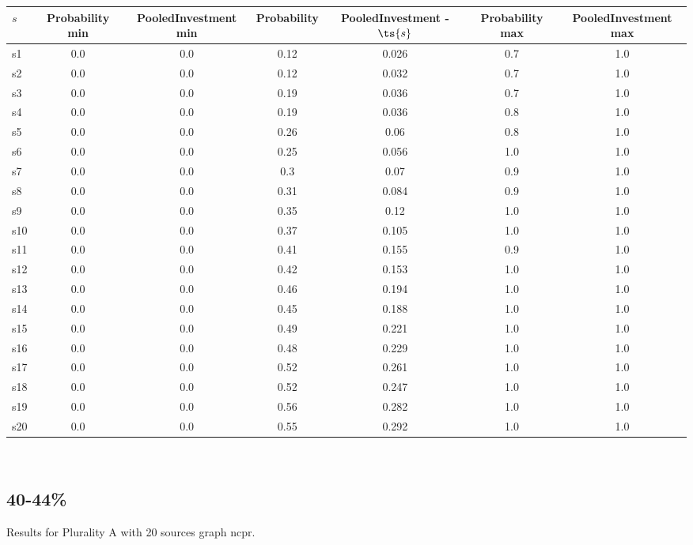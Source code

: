 \documentclass{article}
\begin{document}
\noindent\begin{tabular}{|l|c|c|c|c|c|c|}
\hline
$s$& Probability min & PooledInvestment min & Probability & PooledInvestment - $\ts{s}$ & Probability max & PooledInvestment max\\
\hline
s1 &0.0 & 0.0 & 0.12 & 0.026 & 0.7 & 1.0\\
\hline
s2 &0.0 & 0.0 & 0.12 & 0.032 & 0.7 & 1.0\\
\hline
s3 &0.0 & 0.0 & 0.19 & 0.036 & 0.7 & 1.0\\
\hline
s4 &0.0 & 0.0 & 0.19 & 0.036 & 0.8 & 1.0\\
\hline
s5 &0.0 & 0.0 & 0.26 & 0.06 & 0.8 & 1.0\\
\hline
s6 &0.0 & 0.0 & 0.25 & 0.056 & 1.0 & 1.0\\
\hline
s7 &0.0 & 0.0 & 0.3 & 0.07 & 0.9 & 1.0\\
\hline
s8 &0.0 & 0.0 & 0.31 & 0.084 & 0.9 & 1.0\\
\hline
s9 &0.0 & 0.0 & 0.35 & 0.12 & 1.0 & 1.0\\
\hline
s10 &0.0 & 0.0 & 0.37 & 0.105 & 1.0 & 1.0\\
\hline
s11 &0.0 & 0.0 & 0.41 & 0.155 & 0.9 & 1.0\\
\hline
s12 &0.0 & 0.0 & 0.42 & 0.153 & 1.0 & 1.0\\
\hline
s13 &0.0 & 0.0 & 0.46 & 0.194 & 1.0 & 1.0\\
\hline
s14 &0.0 & 0.0 & 0.45 & 0.188 & 1.0 & 1.0\\
\hline
s15 &0.0 & 0.0 & 0.49 & 0.221 & 1.0 & 1.0\\
\hline
s16 &0.0 & 0.0 & 0.48 & 0.229 & 1.0 & 1.0\\
\hline
s17 &0.0 & 0.0 & 0.52 & 0.261 & 1.0 & 1.0\\
\hline
s18 &0.0 & 0.0 & 0.52 & 0.247 & 1.0 & 1.0\\
\hline
s19 &0.0 & 0.0 & 0.56 & 0.282 & 1.0 & 1.0\\
\hline
s20 &0.0 & 0.0 & 0.55 & 0.292 & 1.0 & 1.0\\
\hline
\end{tabular}\\

\newpage

\subsection{40-44\%}

\noindent Results for Plurality A with 20 sources graph ncpr.
\end{document}
